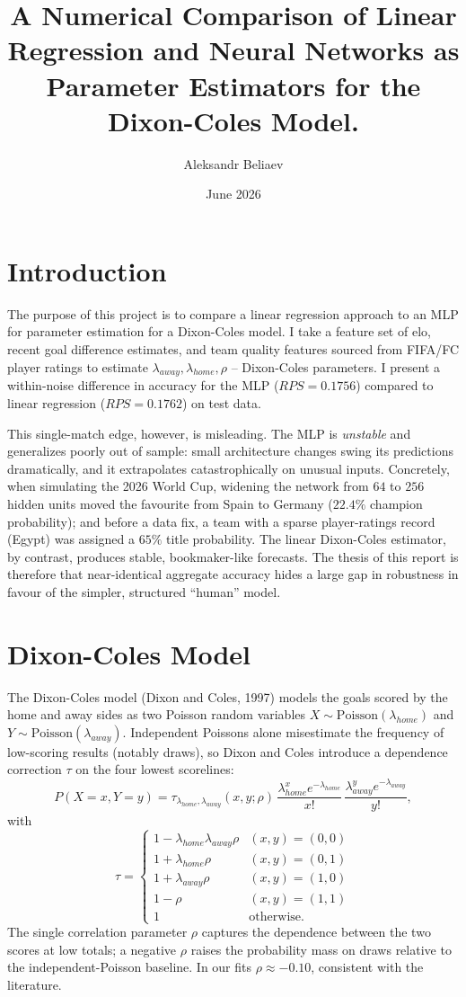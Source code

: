 \documentclass{article}
\title{A Numerical Comparison of Linear Regression and Neural Networks as Parameter Estimators for the Dixon-Coles Model.}
\author{Aleksandr Beliaev}
\date{June 2026}
\begin{document}
\maketitle

\section{Introduction}

The purpose of this project is to compare a linear regression approach to an MLP for parameter estimation for a Dixon-Coles model. I take a feature set of elo, recent goal difference estimates, and team quality features sourced from FIFA/FC player ratings to estimate $\lambda_{away}, \lambda_{home}, \rho$ -- Dixon-Coles parameters. I present a within-noise difference in accuracy for the MLP ($RPS = 0.1756$) compared to linear regression ($RPS = 0.1762$) on test data.

This single-match edge, however, is misleading. The MLP is \emph{unstable} and generalizes poorly out of sample: small architecture changes swing its predictions dramatically, and it extrapolates catastrophically on unusual inputs. Concretely, when simulating the 2026 World Cup, widening the network from $64$ to $256$ hidden units moved the favourite from Spain to Germany ($22.4\%$ champion probability); and before a data fix, a team with a sparse player-ratings record (Egypt) was assigned a $65\%$ title probability. The linear Dixon-Coles estimator, by contrast, produces stable, bookmaker-like forecasts. The thesis of this report is therefore that near-identical aggregate accuracy hides a large gap in robustness in favour of the simpler, structured ``human'' model.

\section{Dixon-Coles Model}

The Dixon-Coles model (Dixon and Coles, 1997) models the goals scored by the home and away sides as two Poisson random variables $X \sim \text{Poisson}(\lambda_{home})$ and $Y \sim \text{Poisson}(\lambda_{away})$. Independent Poissons alone misestimate the frequency of low-scoring results (notably draws), so Dixon and Coles introduce a dependence correction $\tau$ on the four lowest scorelines:
\[
P(X=x, Y=y) = \tau_{\lambda_{home},\lambda_{away}}(x,y;\rho)\, \frac{\lambda_{home}^{x}e^{-\lambda_{home}}}{x!}\,\frac{\lambda_{away}^{y}e^{-\lambda_{away}}}{y!},
\]
with
\[
\tau = \begin{cases}
1 - \lambda_{home}\lambda_{away}\rho & (x,y)=(0,0)\\
1 + \lambda_{home}\rho & (x,y)=(0,1)\\
1 + \lambda_{away}\rho & (x,y)=(1,0)\\
1 - \rho & (x,y)=(1,1)\\
1 & \text{otherwise.}
\end{cases}
\]
The single correlation parameter $\rho$ captures the dependence between the two scores at low totals; a negative $\rho$ raises the probability mass on draws relative to the independent-Poisson baseline. In our fits $\rho \approx -0.10$, consistent with the literature.
\end{document}
